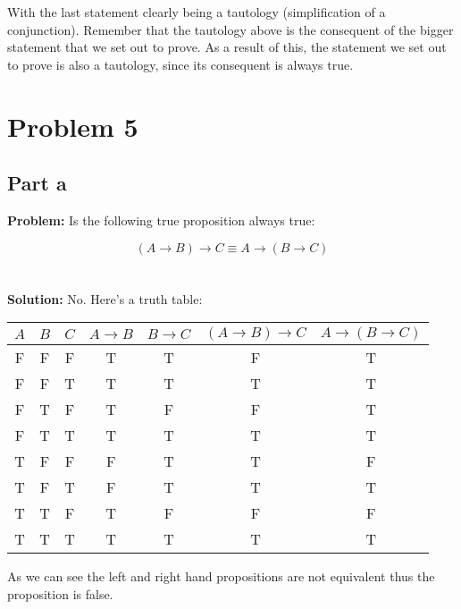 \documentclass{article}
\begin{document}
With the last statement clearly being a tautology (simplification of a conjunction). Remember that the tautology above is the consequent of the bigger statement that we set out to prove. As a result of this, the statement we set out to prove is also a tautology, since its consequent is always true.

\section*{Problem 5}
\subsection*{Part a}
\textbf{Problem:} Is the following true proposition always true:

$$(A\rightarrow B)\rightarrow C \equiv A\rightarrow (B\rightarrow C)$$
\\\\
\textbf{Solution:} No. Here's a truth table:
\begin{center}
\begin{tabular}{ccccccc}
$A$ & $B$ & $C$ & $A\rightarrow B$ & $B\rightarrow C$ & $(A\rightarrow B)\rightarrow C$ & $A\rightarrow (B\rightarrow C)$\\
\midrule
\hline
F&F&F&T&T&F&T\\
F&F&T&T&T&T&T\\
F&T&F&T&F&F&T\\
F&T&T&T&T&T&T\\
T&F&F&F&T&T&F\\
T&F&T&F&T&T&T\\
T&T&F&T&F&F&F\\
T&T&T&T&T&T&T\\
\end{tabular}
\end{center}
As we can see the left and right hand propositions are not equivalent thus the proposition is false.
\end{document}
